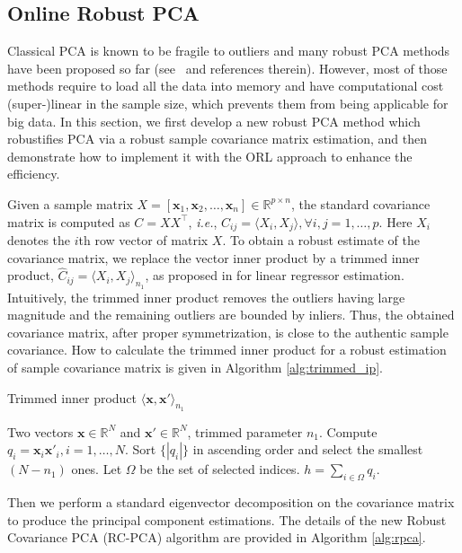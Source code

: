 \documentclass[11pt]{article}
\begin{document}
\subsection{Online Robust PCA}


Classical PCA is known to be fragile to outliers and many robust PCA methods have been proposed so far (see~\cite{HR-PCA} and  references therein). However, most of those methods require to load all the data into memory and have computational cost (super-)linear in the sample size, which prevents them from being applicable for big data. In this section, we first develop a new robust PCA method which robustifies PCA via  a robust sample covariance matrix estimation, and then demonstrate how to implement it with the ORL approach to enhance the efficiency.

Given a sample matrix $X=[\mathbf{x}_1,\mathbf{x}_2,\ldots,\mathbf{x}_n] \in \mathbb{R}^{p \times n}$, the standard covariance matrix is computed as $C=XX^\top$, \emph{i.e.}, $C_{ij} = \langle X_i, X_j\rangle,\forall i,j=1,\ldots,p$. Here $X_i$ denotes the $i$th row vector of matrix $X$. To obtain a robust estimate of the covariance matrix, we replace the vector inner product by a trimmed inner product, $\widehat{C}_{ij} = \langle X_i, X_j\rangle_{n_1}$, as proposed in \cite{chen2013robust} for linear regressor estimation. Intuitively, the trimmed inner product removes the outliers having large magnitude and the remaining outliers are bounded by inliers. Thus, the obtained covariance matrix, after proper symmetrization, is close to the authentic sample covariance. How to calculate the trimmed inner product  for a robust estimation of sample covariance matrix is given in Algorithm \ref{alg:trimmed_ip}. 

\begin{algorithm}[h]
	\caption{Trimmed inner product $\langle\mathbf{x},\mathbf{x}' \rangle_{n_1}$}
	\label{alg:trimmed_ip}
	\begin{algorithmic}
		 Two vectors $\mathbf{x} \in \mathbb{R}^N$ and $\mathbf{x}' \in \mathbb{R}^N$, trimmed parameter $n_1$.
		\STATE Compute $q_i = \mathbf{x}_i\mathbf{x}'_i, i=1,\ldots,N$.
		\STATE Sort $\{|q_i|\}$ in ascending order and select the smallest $(N-n_1)$ ones.
		\STATE Let $\Omega$ be the set of selected indices.
		 $h=\sum_{i\in\Omega}q_i$.
	\end{algorithmic}
\end{algorithm}

Then we perform a standard eigenvector decomposition on the covariance matrix to produce the principal component estimations. 
The details of the new Robust Covariance PCA (RC-PCA) algorithm  are provided in Algorithm \ref{alg:rpca}.
\end{document}
